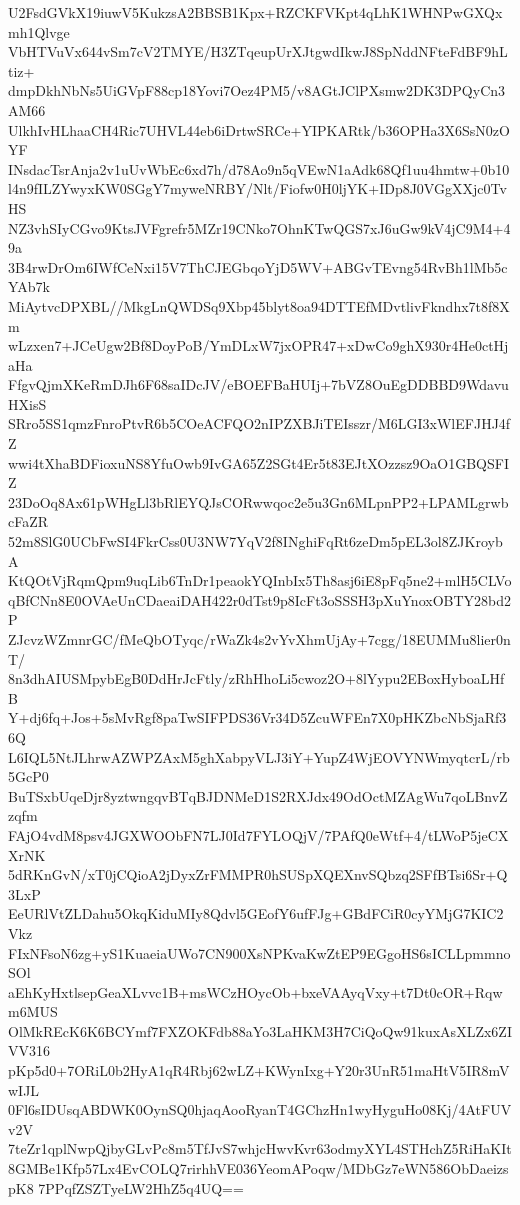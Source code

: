 U2FsdGVkX19iuwV5KukzsA2BBSB1Kpx+RZCKFVKpt4qLhK1WHNPwGXQxmh1Qlvge
VbHTVuVx644vSm7cV2TMYE/H3ZTqeupUrXJtgwdIkwJ8SpNddNFteFdBF9hLtiz+
dmpDkhNbNs5UiGVpF88cp18Yovi7Oez4PM5/v8AGtJClPXsmw2DK3DPQyCn3AM66
UlkhIvHLhaaCH4Ric7UHVL44eb6iDrtwSRCe+YIPKARtk/b36OPHa3X6SsN0zOYF
INsdacTsrAnja2v1uUvWbEc6xd7h/d78Ao9n5qVEwN1aAdk68Qf1uu4hmtw+0b10
l4n9fILZYwyxKW0SGgY7myweNRBY/Nlt/Fiofw0H0ljYK+IDp8J0VGgXXjc0TvHS
NZ3vhSIyCGvo9KtsJVFgrefr5MZr19CNko7OhnKTwQGS7xJ6uGw9kV4jC9M4+49a
3B4rwDrOm6IWfCeNxi15V7ThCJEGbqoYjD5WV+ABGvTEvng54RvBh1lMb5cYAb7k
MiAytvcDPXBL//MkgLnQWDSq9Xbp45blyt8oa94DTTEfMDvtlivFkndhx7t8f8Xm
wLzxen7+JCeUgw2Bf8DoyPoB/YmDLxW7jxOPR47+xDwCo9ghX930r4He0ctHjaHa
FfgvQjmXKeRmDJh6F68saIDcJV/eBOEFBaHUIj+7bVZ8OuEgDDBBD9WdavuHXisS
SRro5SS1qmzFnroPtvR6b5COeACFQO2nIPZXBJiTEIsszr/M6LGI3xWlEFJHJ4fZ
wwi4tXhaBDFioxuNS8YfuOwb9IvGA65Z2SGt4Er5t83EJtXOzzsz9OaO1GBQSFIZ
23DoOq8Ax61pWHgLl3bRlEYQJsCORwwqoc2e5u3Gn6MLpnPP2+LPAMLgrwbcFaZR
52m8SlG0UCbFwSI4FkrCss0U3NW7YqV2f8INghiFqRt6zeDm5pEL3ol8ZJKroybA
KtQOtVjRqmQpm9uqLib6TnDr1peaokYQInbIx5Th8asj6iE8pFq5ne2+mlH5CLVo
qBfCNn8E0OVAeUnCDaeaiDAH422r0dTst9p8IcFt3oSSSH3pXuYnoxOBTY28bd2P
ZJcvzWZmnrGC/fMeQbOTyqc/rWaZk4s2vYvXhmUjAy+7cgg/18EUMMu8lier0nT/
8n3dhAIUSMpybEgB0DdHrJcFtly/zRhHhoLi5cwoz2O+8lYypu2EBoxHyboaLHfB
Y+dj6fq+Jos+5sMvRgf8paTwSIFPDS36Vr34D5ZcuWFEn7X0pHKZbcNbSjaRf36Q
L6IQL5NtJLhrwAZWPZAxM5ghXabpyVLJ3iY+YupZ4WjEOVYNWmyqtcrL/rb5GcP0
BuTSxbUqeDjr8yztwngqvBTqBJDNMeD1S2RXJdx49OdOctMZAgWu7qoLBnvZzqfm
FAjO4vdM8psv4JGXWOObFN7LJ0Id7FYLOQjV/7PAfQ0eWtf+4/tLWoP5jeCXXrNK
5dRKnGvN/xT0jCQioA2jDyxZrFMMPR0hSUSpXQEXnvSQbzq2SFfBTsi6Sr+Q3LxP
EeURlVtZLDahu5OkqKiduMIy8Qdvl5GEofY6ufFJg+GBdFCiR0cyYMjG7KIC2Vkz
FIxNFsoN6zg+yS1KuaeiaUWo7CN900XsNPKvaKwZtEP9EGgoHS6sICLLpmmnoSOl
aEhKyHxtlsepGeaXLvvc1B+msWCzHOycOb+bxeVAAyqVxy+t7Dt0cOR+Rqwm6MUS
OlMkREcK6K6BCYmf7FXZOKFdb88aYo3LaHKM3H7CiQoQw91kuxAsXLZx6ZIVV316
pKp5d0+7ORiL0b2HyA1qR4Rbj62wLZ+KWynIxg+Y20r3UnR51maHtV5IR8mVwIJL
0Fl6sIDUsqABDWK0OynSQ0hjaqAooRyanT4GChzHn1wyHyguHo08Kj/4AtFUVv2V
7teZr1qplNwpQjbyGLvPc8m5TfJvS7whjcHwvKvr63odmyXYL4STHchZ5RiHaKIt
8GMBe1Kfp57Lx4EvCOLQ7rirhhVE036YeomAPoqw/MDbGz7eWN586ObDaeizspK8
7PPqfZSZTyeLW2HhZ5q4UQ==
